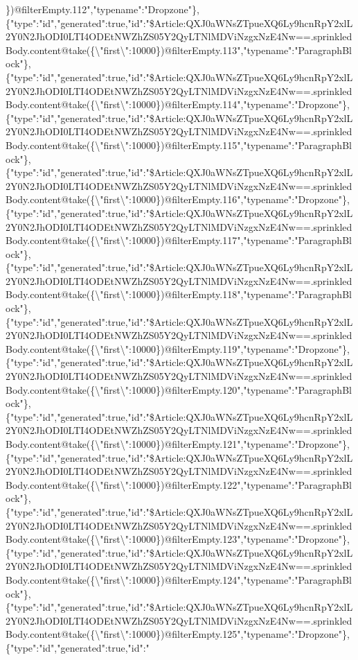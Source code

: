 \})@filterEmpty.112","typename":"Dropzone"\},\{"type":"id","generated":true,"id":"\$Article:QXJ0aWNsZTpueXQ6Ly9hcnRpY2xlL2Y0N2JhODI0LTI4ODEtNWZhZS05Y2QyLTNlMDViNzgxNzE4Nw==.sprinkledBody.content@take(\{\textbackslash{}"first\textbackslash{}":10000\})@filterEmpty.113","typename":"ParagraphBlock"\},\{"type":"id","generated":true,"id":"\$Article:QXJ0aWNsZTpueXQ6Ly9hcnRpY2xlL2Y0N2JhODI0LTI4ODEtNWZhZS05Y2QyLTNlMDViNzgxNzE4Nw==.sprinkledBody.content@take(\{\textbackslash{}"first\textbackslash{}":10000\})@filterEmpty.114","typename":"Dropzone"\},\{"type":"id","generated":true,"id":"\$Article:QXJ0aWNsZTpueXQ6Ly9hcnRpY2xlL2Y0N2JhODI0LTI4ODEtNWZhZS05Y2QyLTNlMDViNzgxNzE4Nw==.sprinkledBody.content@take(\{\textbackslash{}"first\textbackslash{}":10000\})@filterEmpty.115","typename":"ParagraphBlock"\},\{"type":"id","generated":true,"id":"\$Article:QXJ0aWNsZTpueXQ6Ly9hcnRpY2xlL2Y0N2JhODI0LTI4ODEtNWZhZS05Y2QyLTNlMDViNzgxNzE4Nw==.sprinkledBody.content@take(\{\textbackslash{}"first\textbackslash{}":10000\})@filterEmpty.116","typename":"Dropzone"\},\{"type":"id","generated":true,"id":"\$Article:QXJ0aWNsZTpueXQ6Ly9hcnRpY2xlL2Y0N2JhODI0LTI4ODEtNWZhZS05Y2QyLTNlMDViNzgxNzE4Nw==.sprinkledBody.content@take(\{\textbackslash{}"first\textbackslash{}":10000\})@filterEmpty.117","typename":"ParagraphBlock"\},\{"type":"id","generated":true,"id":"\$Article:QXJ0aWNsZTpueXQ6Ly9hcnRpY2xlL2Y0N2JhODI0LTI4ODEtNWZhZS05Y2QyLTNlMDViNzgxNzE4Nw==.sprinkledBody.content@take(\{\textbackslash{}"first\textbackslash{}":10000\})@filterEmpty.118","typename":"ParagraphBlock"\},\{"type":"id","generated":true,"id":"\$Article:QXJ0aWNsZTpueXQ6Ly9hcnRpY2xlL2Y0N2JhODI0LTI4ODEtNWZhZS05Y2QyLTNlMDViNzgxNzE4Nw==.sprinkledBody.content@take(\{\textbackslash{}"first\textbackslash{}":10000\})@filterEmpty.119","typename":"Dropzone"\},\{"type":"id","generated":true,"id":"\$Article:QXJ0aWNsZTpueXQ6Ly9hcnRpY2xlL2Y0N2JhODI0LTI4ODEtNWZhZS05Y2QyLTNlMDViNzgxNzE4Nw==.sprinkledBody.content@take(\{\textbackslash{}"first\textbackslash{}":10000\})@filterEmpty.120","typename":"ParagraphBlock"\},\{"type":"id","generated":true,"id":"\$Article:QXJ0aWNsZTpueXQ6Ly9hcnRpY2xlL2Y0N2JhODI0LTI4ODEtNWZhZS05Y2QyLTNlMDViNzgxNzE4Nw==.sprinkledBody.content@take(\{\textbackslash{}"first\textbackslash{}":10000\})@filterEmpty.121","typename":"Dropzone"\},\{"type":"id","generated":true,"id":"\$Article:QXJ0aWNsZTpueXQ6Ly9hcnRpY2xlL2Y0N2JhODI0LTI4ODEtNWZhZS05Y2QyLTNlMDViNzgxNzE4Nw==.sprinkledBody.content@take(\{\textbackslash{}"first\textbackslash{}":10000\})@filterEmpty.122","typename":"ParagraphBlock"\},\{"type":"id","generated":true,"id":"\$Article:QXJ0aWNsZTpueXQ6Ly9hcnRpY2xlL2Y0N2JhODI0LTI4ODEtNWZhZS05Y2QyLTNlMDViNzgxNzE4Nw==.sprinkledBody.content@take(\{\textbackslash{}"first\textbackslash{}":10000\})@filterEmpty.123","typename":"Dropzone"\},\{"type":"id","generated":true,"id":"\$Article:QXJ0aWNsZTpueXQ6Ly9hcnRpY2xlL2Y0N2JhODI0LTI4ODEtNWZhZS05Y2QyLTNlMDViNzgxNzE4Nw==.sprinkledBody.content@take(\{\textbackslash{}"first\textbackslash{}":10000\})@filterEmpty.124","typename":"ParagraphBlock"\},\{"type":"id","generated":true,"id":"\$Article:QXJ0aWNsZTpueXQ6Ly9hcnRpY2xlL2Y0N2JhODI0LTI4ODEtNWZhZS05Y2QyLTNlMDViNzgxNzE4Nw==.sprinkledBody.content@take(\{\textbackslash{}"first\textbackslash{}":10000\})@filterEmpty.125","typename":"Dropzone"\},\{"type":"id","generated":true,"id":"\